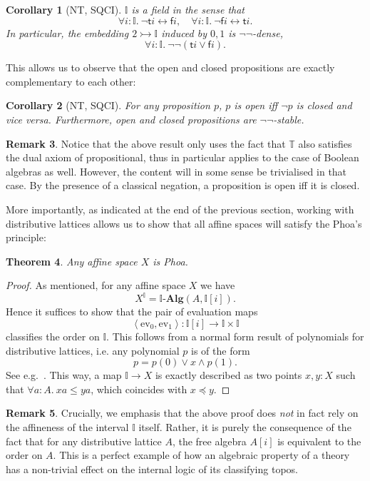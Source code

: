 \documentclass[12pt]{amsart}
\newtheorem{theorem}{Theorem}[section]
\newtheorem{corollary}[theorem]{Corollary}
\theoremstyle{definition}
\newtheorem{remark}[theorem]{Remark}
\newcommand{\mb}[1]{\mathbf{#1}}
\newcommand{\mbb}[1]{\mathbb{#1}}
\newcommand{\T}{\mbb T}
\newcommand{\I}{\mbb I}
\newcommand{\ms}[1]{\mathsf{#1}}
\newcommand{\alg}{\text{-}\mb{Alg}}
\newcommand{\pair}[1]{\left\langle#1\right\rangle}
\newcommand{\ev}{\mathrm{ev}}
\newcommand{\inj}{\rightarrowtail}
\newcommand{\dneg}{\neg\neg}
\newcommand{\fa}[2]{\forall #1\!\colon\!\!#2.\ }
\newcommand{\eq}{\leftrightarrow}
\begin{document}
\begin{corollary}[NT, SQCI]\label{cor:field}
  $\I$ is a field in the sense that
  \[ \fa i{\I} \neg \ms ti \eq \ms fi, \quad \fa i\I \neg\ms fi \eq \ms ti. \]
  In particular, the embedding $2 \inj \I$ induced by $0,1$ is $\neg\neg$-dense,
  \[ \fa i\I \dneg(\ms ti \vee \ms fi). \]
\end{corollary}

This allows us to observe that the open and closed propositions are exactly complementary to each other:

\begin{corollary}[NT, SQCI]\label{cor:opendnegclose}
  For any proposition $p$, $p$ is open iff $\neg p$ is closed and vice versa. Furthermore, open and closed propositions are $\dneg$-stable.
\end{corollary}

\begin{remark}
  Notice that the above result only uses the fact that $\T$ also satisfies the dual axiom of propositional, thus in particular applies to the case of Boolean algebras as well. However, the content will in some sense be trivialised in that case. By the presence of a classical negation, a proposition is open iff it is closed.
\end{remark}

More importantly, as indicated at the end of the previous section, working with distributive lattices allows us to show that all affine spaces will satisfy the Phoa's principle:

\begin{theorem}\label{thm:phoaaffine}
  Any affine space $X$ is Phoa.
\end{theorem}
\begin{proof}
  As mentioned, for any affine space $X$ we have 
  \[ X^\I = \I\alg(A,\I[i]). \]
  Hence it suffices to show that the pair of evaluation maps
  \[ \pair{\ev_0,\ev_1} : \I[i] \to \I \times \I \]
  classifies the order on $\I$. This follows from a normal form result of polynomials for distributive lattices, i.e. any polynomial $p$ is of the form 
  \[ p = p(0) \vee x \wedge p(1). \]
  See e.g.~\cite[Thm. 10.11]{lausch2000algebra}. This way, a map $\I \to X$ is exactly described as two points $x,y : X$ such that $\fa aA xa \le ya$, which coincides with $x \preceq y$.
\end{proof}

\begin{remark}
  Crucially, we emphasis that the above proof does \emph{not} in fact rely on the affineness of the interval $\I$ itself. Rather, it is purely the consequence of the fact that for any distributive lattice $A$, the free algebra $A[i]$ is equivalent to the order on $A$. This is a perfect example of how an algebraic property of a theory has a non-trivial effect on the internal logic of its classifying topos.
\end{remark}
\end{document}
